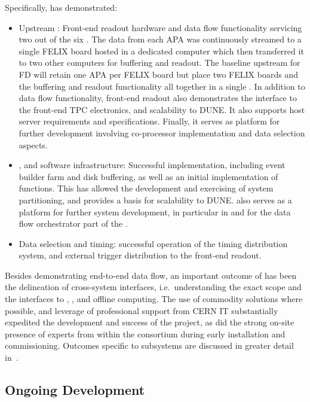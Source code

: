 Specifically,  has demonstrated: 
\begin{itemize}
\item Upstream : Front-end readout hardware and data flow functionality servicing two out of the six .
  The data from each APA was continuously streamed to a single FELIX board hosted in a dedicated computer which then transferred it to two other computers for buffering and readout.
  The baseline upstream  for  FD will retain one APA per FELIX board but place two FELIX boards and the buffering and readout functionality all together in a single . 
  In addition to data flow functionality,  front-end readout also demonstrates the interface to the front-end TPC electronics, and scalability to DUNE. It also supports host server requirements and specifications. Finally, it serves as platform for further development involving co-processor implementation and data selection aspects.
\item {},  and software infrastructure:
 Successful  implementation, including event builder
  farm and disk buffering, as well as an initial implementation of  functions. This has allowed the
  development and exercising of system partitioning, and provides a
  basis for scalability to DUNE.  also serves as
  a platform for further system development, in particular in  and for the data flow orchestrator part of the
  .
\item Data selection and timing: successful operation of the timing
  distribution system, and external trigger distribution to the
  front-end readout.
\end{itemize}

Besides demonstrating end-to-end data flow, an important outcome of
 has been the delineation of cross-system
interfaces, i.e.~understanding the exact  scope and the interfaces to , , and offline computing. The use of commodity solutions
where possible, and leverage of professional support from CERN IT 
substantially expedited the development and success of the project, as
did the strong on-site presence of experts from within the consortium during early installation and
commissioning. 
Outcomes specific to  subsystems are discussed in
greater detail in~\cite{Hennessy:CDRReview}. 

\subsection{Ongoing Development}
\label{sec:sp-daq:design-validation}

